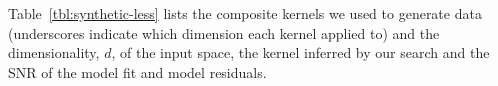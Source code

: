 \documentclass[twoside]{article}
\begin{document}
%
Table~\ref{tbl:synthetic-less} lists the composite kernels we used to generate data (underscores indicate which dimension each kernel applied to) and the dimensionality, $d$, of the input space, the kernel inferred by our search and the SNR of the model fit and model residuals.
\end{document}
